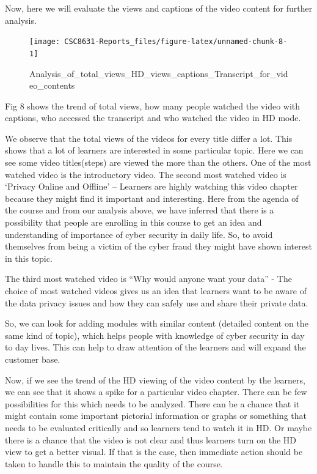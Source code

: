 \documentclass[
]{article}
\begin{document}
Now, here we will evaluate the views and captions of the video content
for further analysis.

\begin{figure}
\texttt{[image: CSC8631-Reports\_files/figure-latex/unnamed-chunk-8-1]} \caption{Analysis_of_total_views_HD_views_captions_Transcript_for_video_contents}\label{fig:unnamed-chunk-8}
\end{figure}

Fig 8 shows the trend of total views, how many people watched the video
with captions, who accessed the transcript and who watched the video in
HD mode.

We observe that the total views of the videos for every title differ a
lot. This shows that a lot of learners are interested in some particular
topic. Here we can see some video titles(steps) are viewed the more than
the others. One of the most watched video is the introductory video. The
second most watched video is `Privacy Online and Offline' -- Learners
are highly watching this video chapter because they might find it
important and interesting. Here from the agenda of the course and from
our analysis above, we have inferred that there is a possibility that
people are enrolling in this course to get an idea and understanding of
importance of cyber security in daily life. So, to avoid themselves from
being a victim of the cyber fraud they might have shown interest in this
topic.

The third most watched video is ``Why would anyone want your data'' -
The choice of most watched videos gives us an idea that learners want to
be aware of the data privacy issues and how they can safely use and
share their private data.

So, we can look for adding modules with similar content (detailed
content on the same kind of topic), which helps people with knowledge of
cyber security in day to day lives. This can help to draw attention of
the learners and will expand the customer base.

Now, if we see the trend of the HD viewing of the video content by the
learners, we can see that it shows a spike for a particular video
chapter. There can be few possibilities for this which needs to be
analyzed. There can be a chance that it might contain some important
pictorial information or graphs or something that needs to be evaluated
critically and so learners tend to watch it in HD. Or maybe there is a
chance that the video is not clear and thus learners turn on the HD view
to get a better visual. If that is the case, then immediate action
should be taken to handle this to maintain the quality of the course.
\end{document}
